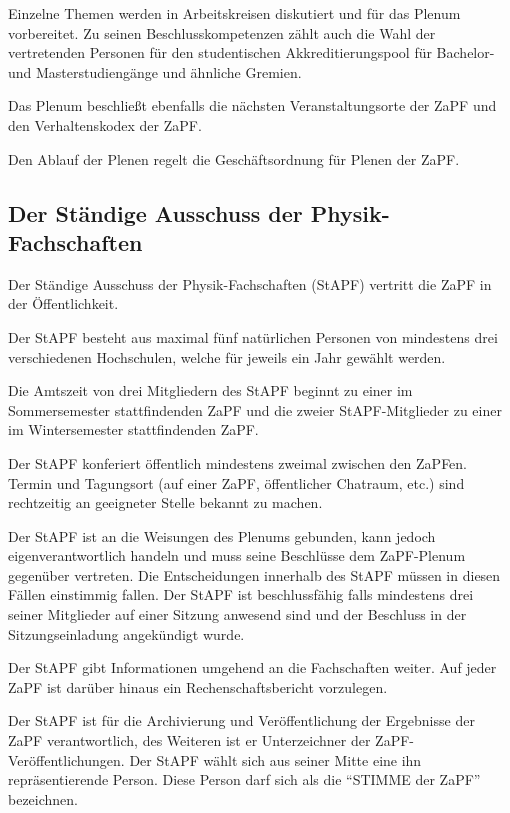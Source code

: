 \documentclass[
  a4paper,
  oneside]{scrartcl}
\begin{document}
Einzelne Themen werden in Arbeitskreisen diskutiert und für das Plenum
vorbereitet. Zu seinen Beschlusskompetenzen zählt auch die Wahl der
vertretenden Personen für den studentischen Akkreditierungspool für
Bachelor- und Masterstudiengänge und ähnliche Gremien.

Das Plenum beschließt ebenfalls die nächsten Veranstaltungsorte der ZaPF
und den Verhaltenskodex der ZaPF.

Den Ablauf der Plenen regelt die Geschäftsordnung für Plenen der ZaPF.

\hypertarget{der-stuxe4ndige-ausschuss-der-physik-fachschaften}{%
\subsection{Der Ständige Ausschuss der
Physik-Fachschaften}\label{der-stuxe4ndige-ausschuss-der-physik-fachschaften}}

Der Ständige Ausschuss der Physik-Fachschaften (StAPF) vertritt die ZaPF
in der Öffentlichkeit.

Der StAPF besteht aus maximal fünf natürlichen Personen von mindestens
drei verschiedenen Hochschulen, welche für jeweils ein Jahr gewählt
werden.

Die Amtszeit von drei Mitgliedern des StAPF beginnt zu einer im
Sommersemester stattfindenden ZaPF und die zweier StAPF-Mitglieder zu
einer im Wintersemester stattfindenden ZaPF.

Der StAPF konferiert öffentlich mindestens zweimal zwischen den ZaPFen.
Termin und Tagungsort (auf einer ZaPF, öffentlicher Chatraum, etc.) sind
rechtzeitig an geeigneter Stelle bekannt zu machen.

Der StAPF ist an die Weisungen des Plenums gebunden, kann jedoch
eigenverantwortlich handeln und muss seine Beschlüsse dem ZaPF-Plenum
gegenüber vertreten. Die Entscheidungen innerhalb des StAPF müssen in
diesen Fällen einstimmig fallen. Der StAPF ist beschlussfähig falls
mindestens drei seiner Mitglieder auf einer Sitzung anwesend sind und
der Beschluss in der Sitzungseinladung angekündigt wurde.

Der StAPF gibt Informationen umgehend an die Fachschaften weiter. Auf
jeder ZaPF ist darüber hinaus ein Rechenschaftsbericht vorzulegen.

Der StAPF ist für die Archivierung und Veröffentlichung der Ergebnisse
der ZaPF verantwortlich, des Weiteren ist er Unterzeichner der
ZaPF-Veröffentlichungen. Der StAPF wählt sich aus seiner Mitte eine ihn
repräsentierende Person. Diese Person darf sich als die ``STIMME der
ZaPF'' bezeichnen.
\end{document}

